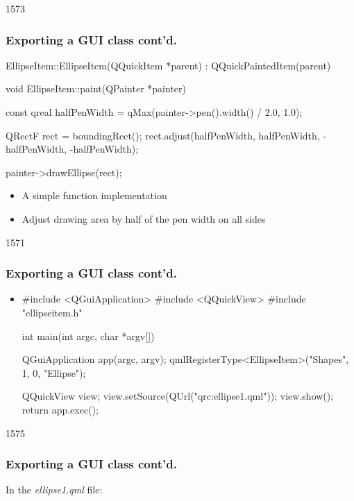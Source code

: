 \begin{slide}[fragile]{1573}\frametitle{Exporting a GUI class cont'd.}
\begin{cpp}
EllipseItem::EllipseItem(QQuickItem *parent)
    : QQuickPaintedItem(parent)
{
}

void EllipseItem::paint(QPainter *painter)
{
    const qreal halfPenWidth =
      qMax(painter->pen().width() / 2.0, 1.0);
    
    QRectF rect = boundingRect();
    rect.adjust(halfPenWidth, halfPenWidth,
                -halfPenWidth, -halfPenWidth);
    
    painter->drawEllipse(rect);
}
\end{cpp}
\begin{itemize}
\item A simple  function implementation
\item Adjust drawing area by half of the pen width on all sides
\end{itemize}
\end{slide}

\begin{slide}[fragile]{1571}\frametitle{Exporting a GUI class cont'd.}

\begin{itemize}
\item[]
\begin{cpp}
#include <QGuiApplication>
#include <QQuickView>
#include "ellipseitem.h"

int main(int argc, char *argv[])
{
    QGuiApplication app(argc, argv);
    qmlRegisterType<EllipseItem>("Shapes", 1, 0, "Ellipse");

    QQuickView view;
    view.setSource(QUrl("qrc:ellipse1.qml"));
    view.show();
    return app.exec();
}
\end{cpp}

\end{itemize}
\end{slide}


\begin{slide}[fragile]{1575}\frametitle{Exporting a GUI class cont'd.}

In the \textit{ellipse1.qml} file:

\vspace*{0.5em}

\end{slide}

